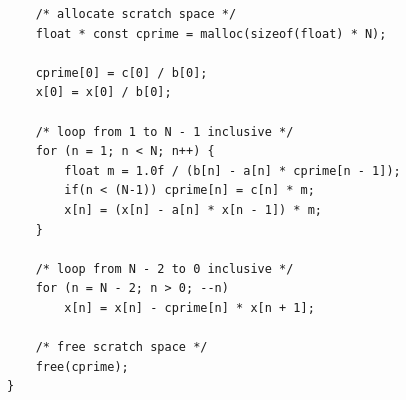 \documentclass[12pt,spanish]{iopart}
\begin{document}
\begin{itemize}
\begin{lstlisting}
    /* allocate scratch space */
    float * const cprime = malloc(sizeof(float) * N);
     
    cprime[0] = c[0] / b[0];
    x[0] = x[0] / b[0];
    
    /* loop from 1 to N - 1 inclusive */
    for (n = 1; n < N; n++) {
        float m = 1.0f / (b[n] - a[n] * cprime[n - 1]);
        if(n < (N-1)) cprime[n] = c[n] * m;
        x[n] = (x[n] - a[n] * x[n - 1]) * m;
    }
    
    /* loop from N - 2 to 0 inclusive */
    for (n = N - 2; n > 0; --n)
        x[n] = x[n] - cprime[n] * x[n + 1];
      
    /* free scratch space */
    free(cprime);
}
\end{lstlisting}
\end{itemize}

\end{document}
